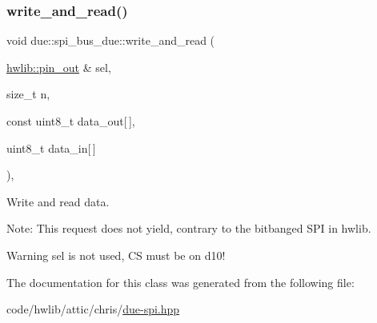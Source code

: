 \subsubsection{\texorpdfstring{write\+\_\+and\+\_\+read()}{write\_and\_read()}}
{\footnotesize\ttfamily void due\+::spi\+\_\+bus\+\_\+due\+::write\+\_\+and\+\_\+read (\begin{DoxyParamCaption}\item[{\hyperlink{classhwlib_1_1pin__out}{hwlib\+::pin\+\_\+out} \&}]{sel,  }\item[{size\+\_\+t}]{n,  }\item[{const uint8\+\_\+t}]{data\+\_\+out\mbox{[}$\,$\mbox{]},  }\item[{uint8\+\_\+t}]{data\+\_\+in\mbox{[}$\,$\mbox{]} }\end{DoxyParamCaption})\hspace{0.3cm}{\ttfamily [inline]}, {\ttfamily [override]}}



Write and read data. 

Note\+: This request does not yield, contrary to the bitbanged S\+PI in hwlib.

\begin{DoxyWarning}{Warning}
{\ttfamily sel} is not used, CS must be on d10! 
\end{DoxyWarning}


The documentation for this class was generated from the following file\+:\begin{DoxyCompactItemize}
\item 
code/hwlib/attic/chris/\hyperlink{due-spi_8hpp}{due-\/spi.\+hpp}\end{DoxyCompactItemize}
